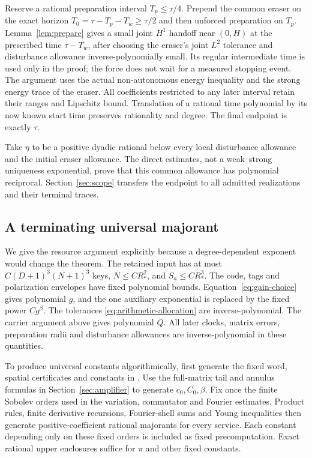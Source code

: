 \documentclass[11pt,a4paper]{amsart}
\theoremstyle{definition}
\theoremstyle{remark}
\numberwithin{equation}{section}
\begin{document}
Reserve a rational preparation interval $T_p\le\tau/4$. Prepend the common
eraser on the exact horizon $T_0=\tau-T_p-T_w\ge\tau/2$ and then unforced
preparation on $T_p$. Lemma~\ref{lem:prepare} gives a small joint $H^1$
handoff near $(0,H)$ at the prescribed time $\tau-T_w$, after choosing the
eraser's joint $L^2$ tolerance and disturbance allowance inverse-polynomially
small. Its regular intermediate time is used only in the proof; the force
does not wait for a measured stopping event. The argument uses the actual
non-autonomous energy inequality and the strong energy trace of the eraser.
All coefficients restricted to any later interval retain their ranges and
Lipschitz bound. Translation of a rational time polynomial by its now known
start time preserves rationality and degree. The final endpoint is exactly
$\tau$.

Take $\eta$ to be a positive dyadic rational below every local disturbance
allowance and the initial eraser allowance. The direct estimates, not a
weak--strong uniqueness exponential, prove that this common allowance has
polynomial reciprocal. Section~\ref{sec:scope} transfers the endpoint to all
admitted realizations and their terminal traces.

\subsection{A terminating universal majorant}
We give the resource argument explicitly because a degree-dependent exponent
would change the theorem. The retained input has at most
$C(D+1)^3(N+1)^3$ keys, $N\le C R_*^2$, and $S_a\le C R_*^3$.
The code, tags and polarization envelopes have fixed polynomial bounds.
Equation~\eqref{eq:gain-choice} gives polynomial $g$, and the one auxiliary
exponential is replaced by the fixed power $Cg^\beta$. The tolerances
\eqref{eq:arithmetic-allocation} are inverse-polynomial. The carrier argument
above gives polynomial $Q$. All later clocks, matrix errors, preparation
radii and disturbance allowances are inverse-polynomial in these quantities.

To produce universal constants algorithmically, first generate the fixed word,
spatial certificates and constants in \cite{Common}. Use the full-matrix
tail and annulus formulas in Section~\ref{sec:amplifier} to generate
$c_0,C_0,\beta$. Fix once the finite Sobolev orders used in the variation,
commutator and Fourier estimates. Product rules, finite derivative recursions,
Fourier-shell sums and Young inequalities then generate positive-coefficient
rational majorants for every service. Each constant depending only on these
fixed orders is included as fixed precomputation. Exact rational upper
enclosures suffice for $\pi$ and other fixed constants.
\end{document}
